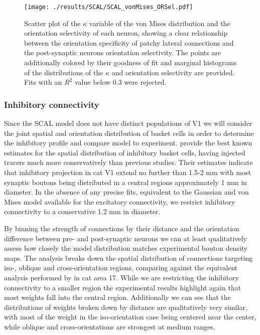 \begin{figure}
	\centering
        \texttt{[image: ./results/SCAL/SCAL\_vonMises\_ORSel.pdf]}
	\caption[Relationship between the width of vonMises distribution
      in the lateral connectivity model and the orientation
      selectivity of the neuron.]{Scatter plot of the $\kappa$
      variable of the von Mises distribution and the orientation
      selectivity of each neuron, showing a clear relationship between
      the orientation specificity of patchy lateral connections and
      the post-synaptic neurons orientation selectivity. The points
      are additionally colored by their goodness of fit and marginal
      histograms of the distributions of the $\kappa$ and orientation
      selectivity are provided. Fits with an $R^2$ value below 0.3
      were rejected.}
	\label{LatORKappa}
\end{figure}

\subsubsection{Inhibitory connectivity}

Since the SCAL model does not have distinct populations of V1 we will
consider the joint spatial and orientation distribution of basket
cells in order to determine the inhibitory profile and compare model
to experiment. \cite{Kisvarday1997a} provide the best known estimates
for the spatial distribution of inhibitory basket cells, having
injected tracers much more conservatively than previous studies. Their
estimates indicate that inhibitory projection in cat V1 extend no
further than 1.5-2 mm with most synaptic boutons being distributed in
a central regions approximately 1 mm in diameter. In the absence of
any precise fits, equivalent to the Gaussian and von Mises model
available for the excitatory connectivity, we restrict inhibitory
connectivity to a conservative 1.2 mm in diameter.

By binning the strength of connections by their distance and the
orientation difference between pre- and post-synaptic neurons we can
at least qualitatively assess how closely the model distribution
matches experimental bouton density maps. The analysis breaks down the
spatial distribution of connections targeting iso-, oblique and
cross-orientation regions, comparing against the equivalent analysis
performed by \cite{Kisvarday1997a} in cat area 17. While we are
restricting the inhibitory connectivity to a smaller region the
experimental results highlight again that most weights fall into the
central region. Additionally we can see that the distributions of
weights broken down by distance are qualitatively very similar, with
most of the weight in the iso-orientation case being centered near the
center, while oblique and cross-orientations are strongest at medium
ranges.


